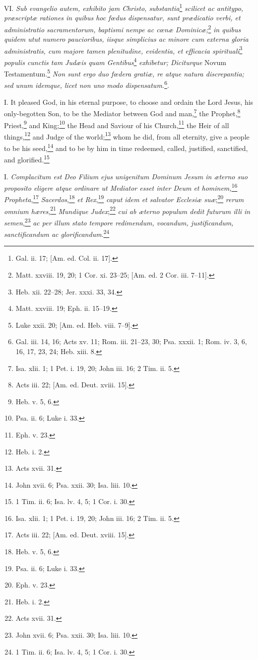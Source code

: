 VI. \emph{Sub evangelio autem, exhibito jam Christo, substantia}\footnote{Gal. ii. 17; [Am. ed. Col. ii. 17].}\emph{ scilicet ac antitypo, præscriptæ rationes in quibus hoc fœdus dispensatur, sunt prædicatio verbi, et administratio sacramentorum, baptismi nempe ac cœnæ Dominicæ;}\footnote{Matt. xxviii. 19, 20; 1 Cor. xi. 23–25; [Am. ed. 2 Cor. iii. 7–11].}\emph{ in quibus quidem utut numero paucioribus, iisque simplicius ac minore cum externa gloria administratis, cum majore tamen plenitudine, evidentia, et efficacia spirituali}\footnote{Heb. xii. 22–28; Jer. xxxi. 33, 34.}\emph{ populis cunctis tam Judæis quam Gentibus}\footnote{Matt. xxviii. 19; Eph. ii. 15–19.}\emph{ exhibetur; Diciturque} Novum Testamentum.\footnote{Luke xxii. 20; [Am. ed. Heb. viii. 7–9].}\emph{ Non sunt ergo duo fœdera gratiæ, re atque natura discrepantia; sed unum idemque, licet non uno modo dispensatum.}\footnote{Gal. iii. 14, 16; Acts xv. 11; Rom. iii. 21–23, 30; Psa. xxxii. 1; Rom. iv. 3, 6, 16, 17, 23, 24; Heb. xiii. 8.}.


I. It pleased God, in his eternal purpose, to choose and ordain the Lord Jesus, his only-begotten Son, to be the Mediator between God and man,\footnote{Isa. xlii. 1; 1 Pet. i. 19, 20; John iii. 16; 2 Tim. ii. 5.} the Prophet,\footnote{Acts iii. 22; [Am. ed. Deut. xviii. 15].} Priest,\footnote{Heb. v. 5, 6.} and King;\footnote{Psa. ii. 6; Luke i. 33.} the Head and Saviour of his Church,\footnote{Eph. v. 23.} the Heir of all things,\footnote{Heb. i. 2.} and Judge of the world;\footnote{Acts xvii. 31.} whom he did, from all eternity, give a people to be his seed,\footnote{John xvii. 6; Psa. xxii. 30; Isa. liii. 10.} and to be by him in time redeemed, called, justified, sanctified, and glorified.\footnote{1 Tim. ii. 6; Isa. lv. 4, 5; 1 Cor. i. 30.}

I. \emph{Complacitum est Deo Filium ejus unigenitum Dominum Jesum in æterno suo proposito eligere atque ordinare ut Mediator esset inter Deum et hominem,}\footnote{Isa. xlii. 1; 1 Pet. i. 19, 20; John iii. 16; 2 Tim. ii. 5.} \emph{Propheta},\footnote{Acts iii. 22; [Am. ed. Deut. xviii. 15].} \emph{Sacerdos},\footnote{Heb. v. 5, 6.} \emph{et Rex},\footnote{Psa. ii. 6; Luke i. 33.} \emph{caput idem et salvator Ecclesiæ suæ};\footnote{Eph. v. 23.} \emph{rerum omnium hæres},\footnote{Heb. i. 2.} \emph{Mundique Judex};\footnote{Acts xvii. 31.} \emph{cui ab æterno populum dedit futurum illi in semen},\footnote{John xvii. 6; Psa. xxii. 30; Isa. liii. 10.} \emph{ac per illum stato tempore redimendum, vocandum, justificandum, sanctificandum ac glorificandum}.\footnote{1 Tim. ii. 6; Isa. lv. 4, 5; 1 Cor. i. 30.}

